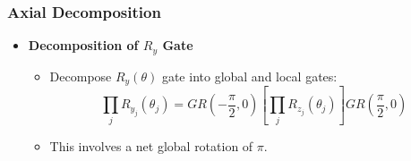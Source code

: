 \documentclass[18 pt]{beamer}
\begin{document}
\begin{frame}
    \frametitle{Axial Decomposition}
    \begin{itemize}
        \item \textbf{Decomposition of $R_y$ Gate}
        \begin{itemize}
            \item Decompose $R_y(\theta)$ gate into global and local gates:
            \[
            \prod_j R_{y_j}(\theta_j) = GR\left(-\frac{\pi}{2}, 0\right) \left[\prod_j R_{z_j}(\theta_j)\right] GR\left(\frac{\pi}{2}, 0\right)
            \]
            \item This involves a net global rotation of $\pi$.
        \end{itemize}
    \end{itemize}
\end{frame}
\end{document}
